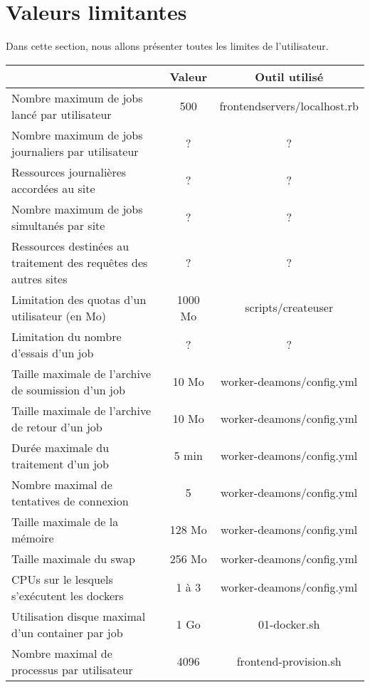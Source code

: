\section{Valeurs limitantes}

Dans cette section, nous allons présenter toutes les limites de l'utilisateur.


\begin{center}
	\begin{tabular}{| L{8cm} | c | c |}
		\hline
		  & {\bf Valeur} & {\bf Outil utilisé} \\ \hline
		Nombre maximum de jobs lancé par utilisateur & 500 & frontendservers/localhost.rb \\ \hline
		Nombre maximum de jobs journaliers par utilisateur & ? & ? \\ \hline
		Ressources journalières accordées au site & ? & ? \\ \hline
		Nombre maximum de jobs simultanés par site & ? & ? \\ \hline
		Ressources destinées au traitement des requêtes des autres sites & ? & ? \\ \hline
		Limitation des quotas d'un utilisateur (en Mo) & 1000 Mo & scripts/createuser \\ \hline
		Limitation du nombre d'essais d'un job & ? & ? \\ \hline
		Taille maximale de l'archive de soumission d'un job & 10 Mo & worker-deamons/config.yml \\ \hline
		Taille maximale de l'archive de retour d'un job & 10 Mo & worker-deamons/config.yml \\ \hline
		Durée maximale du traitement d'un job & 5 min & worker-deamons/config.yml \\ \hline
		Nombre maximal de tentatives de connexion & 5 & worker-deamons/config.yml \\ \hline
		Taille maximale de la mémoire & 128 Mo & worker-deamons/config.yml \\ \hline
		Taille maximale du swap & 256 Mo & worker-deamons/config.yml \\ \hline
		CPUs sur le lesquels s'exécutent les dockers & 1 à 3 & worker-deamons/config.yml \\ \hline
		Utilisation disque maximal d'un container par job & 1 Go & 01-docker.sh \\ \hline
		Nombre maximal de processus par utilisateur & 4096 & frontend-provision.sh \\ \hline
	\end{tabular}
\end{center}
